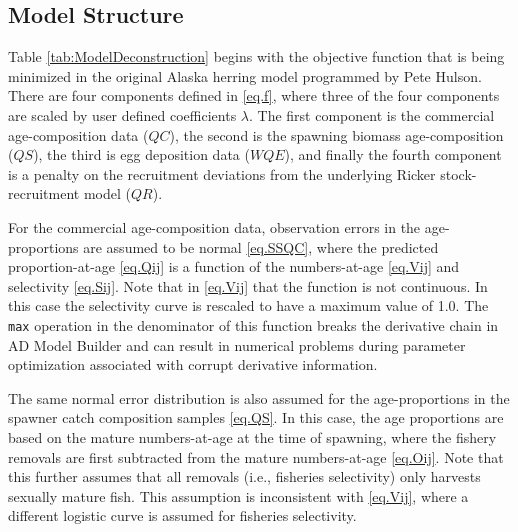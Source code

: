 \documentclass[12pt,letterpaper]{article}
\begin{document}
    \subsection{Model Structure} %
    \label{sub:model_structure}
    
    Table \ref{tab:ModelDeconstruction} begins with the objective function that is being minimized in the original Alaska herring model programmed by Pete Hulson.   There are four components defined in \eqref{eq.f}, where three of the four components are scaled by user defined coefficients $\lambda$.  The first component is the commercial age-composition data ($QC$), the second is the spawning biomass age-composition ($QS$), the third is egg deposition data ($WQE$), and finally the fourth component is a penalty on the recruitment deviations from the underlying Ricker stock-recruitment model ($QR$).

    For the commercial age-composition data, observation errors in the age-proportions are assumed to be normal \eqref{eq.SSQC}, where the predicted proportion-at-age \eqref{eq.Qij} is a function of the numbers-at-age \eqref{eq.Vij} and selectivity \eqref{eq.Sij}. Note that in \eqref{eq.Vij} that the function is not continuous. In this case the selectivity curve is rescaled to have a maximum value of 1.0. The \texttt{max} operation in the denominator of this function breaks the derivative chain in AD Model Builder and can result in numerical problems during parameter optimization associated with corrupt derivative information. 

    The same normal error distribution is also assumed for the age-proportions in the spawner catch composition samples \eqref{eq.QS}.  In this case, the age proportions are based on the mature numbers-at-age at the time of spawning, where the fishery removals are first subtracted from the mature numbers-at-age \eqref{eq.Oij}.  Note that this further assumes that all removals (i.e., fisheries selectivity) only harvests sexually mature fish.  This assumption is inconsistent with \eqref{eq.Vij}, where a different logistic curve is assumed for fisheries selectivity.  
\end{document}
